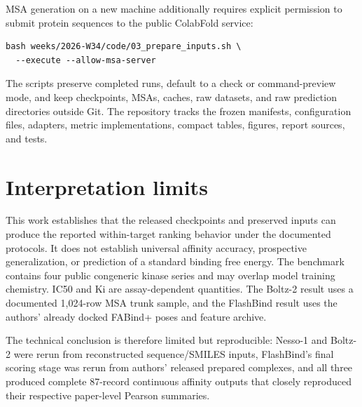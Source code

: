 \documentclass[11pt]{article}
\begin{document}
MSA generation on a new machine additionally requires explicit permission to
submit protein sequences to the public ColabFold service:
\begin{verbatim}
bash weeks/2026-W34/code/03_prepare_inputs.sh \
  --execute --allow-msa-server
\end{verbatim}

The scripts preserve completed runs, default to a check or command-preview
mode, and keep checkpoints, MSAs, caches, raw datasets, and raw prediction
directories outside Git. The repository tracks the frozen manifests,
configuration files, adapters, metric implementations, compact tables,
figures, report sources, and tests.

\section{Interpretation limits}

This work establishes that the released checkpoints and preserved inputs can
produce the reported within-target ranking behavior under the documented
protocols. It does not establish universal affinity accuracy, prospective
generalization, or prediction of a standard binding free energy. The
benchmark contains four public congeneric kinase series and may overlap model
training chemistry. IC50 and Ki are assay-dependent quantities. The Boltz-2
result uses a documented 1,024-row MSA trunk sample, and the FlashBind result
uses the authors' already docked FABind+ poses and feature archive.

The technical conclusion is therefore limited but reproducible: Nesso-1 and
Boltz-2 were rerun from reconstructed sequence/SMILES inputs, FlashBind's final
scoring stage was rerun from authors' released prepared complexes, and all
three produced complete 87-record continuous affinity outputs that closely
reproduced their respective paper-level Pearson summaries.



\end{document}
